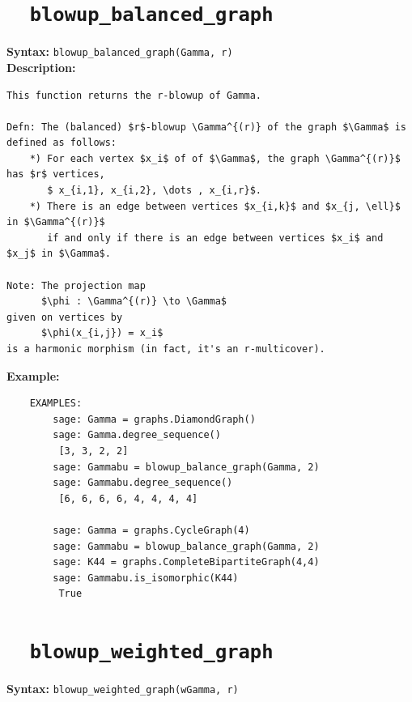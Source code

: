 \documentclass{article}
\begin{document}
\section{\tt \ \ blowup\_balanced\_graph}

\textbf{Syntax:} \verb}blowup_balanced_graph(Gamma, r)}\\

\textbf{Description:}
\begin{verbatim}
This function returns the r-blowup of Gamma.

Defn: The (balanced) $r$-blowup \Gamma^{(r)} of the graph $\Gamma$ is defined as follows: 
    *) For each vertex $x_i$ of of $\Gamma$, the graph \Gamma^{(r)}$ has $r$ vertices, 
       $ x_{i,1}, x_{i,2}, \dots , x_{i,r}$.
    *) There is an edge between vertices $x_{i,k}$ and $x_{j, \ell}$ in $\Gamma^{(r)}$
       if and only if there is an edge between vertices $x_i$ and $x_j$ in $\Gamma$.

Note: The projection map 
      $\phi : \Gamma^{(r)} \to \Gamma$ 
given on vertices by 
      $\phi(x_{i,j}) = x_i$ 
is a harmonic morphism (in fact, it's an r-multicover).    
\end{verbatim}

\textbf{Example:}
\begin{verbatim}
    EXAMPLES:
        sage: Gamma = graphs.DiamondGraph()  
        sage: Gamma.degree_sequence()        
         [3, 3, 2, 2]
        sage: Gammabu = blowup_balance_graph(Gamma, 2)
        sage: Gammabu.degree_sequence()      
         [6, 6, 6, 6, 4, 4, 4, 4]

        sage: Gamma = graphs.CycleGraph(4)   
        sage: Gammabu = blowup_balance_graph(Gamma, 2)
        sage: K44 = graphs.CompleteBipartiteGraph(4,4)
        sage: Gammabu.is_isomorphic(K44)      
         True
\end{verbatim}

\section{\tt \ \ blowup\_weighted\_graph}

\textbf{Syntax:} \verb}blowup_weighted_graph(wGamma, r)}\\
\end{document}
